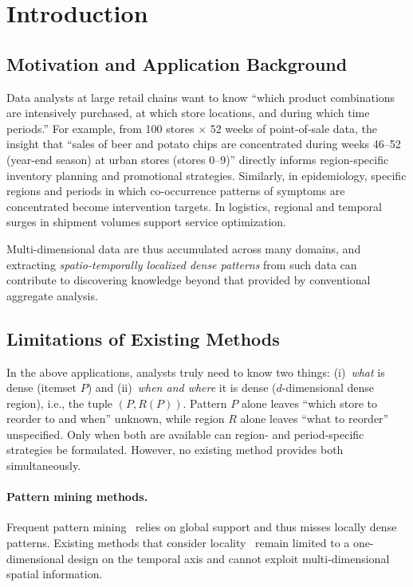 \section{Introduction}\label{sec:intro}

\subsection{Motivation and Application Background}

Data analysts at large retail chains want to know
``which product combinations are intensively purchased,
at which store locations, and during which time periods.''
For example, from 100 stores $\times$ 52 weeks of
point-of-sale data, the insight that
``sales of beer and potato chips are concentrated during
weeks 46--52 (year-end season) at urban stores (stores 0--9)''
directly informs region-specific inventory planning
and promotional strategies.
Similarly, in epidemiology, specific regions and periods
in which co-occurrence patterns of symptoms are concentrated
become intervention targets.
In logistics, regional and temporal surges in shipment volumes
support service optimization.

Multi-dimensional data are thus accumulated across many domains,
and extracting \emph{spatio-temporally localized dense patterns}
from such data can contribute to discovering knowledge
beyond that provided by conventional aggregate analysis.

\subsection{Limitations of Existing Methods}

In the above applications, analysts truly need to know two things:
(i)~\emph{what} is dense (itemset $P$) and
(ii)~\emph{when and where} it is dense ($d$-dimensional dense region),
i.e., the tuple $(P, R(P))$.
Pattern $P$ alone leaves ``which store to reorder to and when'' unknown,
while region $R$ alone leaves ``what to reorder'' unspecified.
Only when both are available can region- and period-specific
strategies be formulated.
However, no existing method provides both simultaneously.

\paragraph{Pattern mining methods.}
Frequent pattern mining~\cite{agrawal1994apriori,han2000mining}
relies on global support and thus misses locally dense patterns.
Existing methods that consider locality~\cite{aprioriwindow}
remain limited to a one-dimensional design on the temporal axis
and cannot exploit multi-dimensional spatial information.
